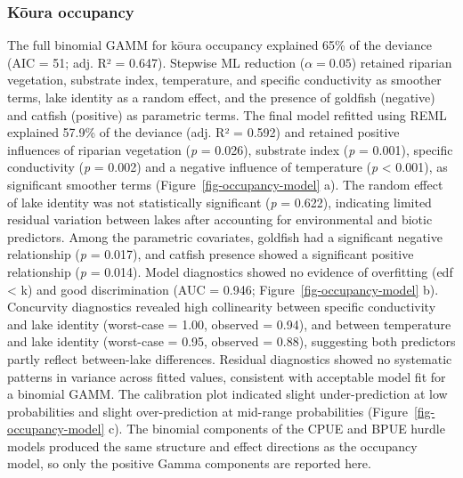 \documentclass[
  letterpaper,
  DIV=11,
  numbers=noendperiod]{scrartcl}
\begin{document}
\subsubsection{Kōura occupancy}\label{kux14dura-occupancy}

The full binomial GAMM for kōura occupancy explained 65\% of the
deviance (AIC = 51; adj. R² = 0.647). Stepwise ML reduction
(\(\alpha = 0.05\)) retained riparian vegetation, substrate index,
temperature, and specific conductivity as smoother terms, lake identity
as a random effect, and the presence of goldfish (negative) and catfish
(positive) as parametric terms. The final model refitted using REML
explained 57.9\% of the deviance (adj. R² = 0.592) and retained positive
influences of riparian vegetation (\emph{p} = 0.026), substrate index
(\emph{p} = 0.001), specific conductivity (\emph{p} = 0.002) and a
negative influence of temperature (\emph{p} \textless{} 0.001), as
significant smoother terms (Figure~\ref{fig-occupancy-model} a). The
random effect of lake identity was not statistically significant
(\emph{p} = 0.622), indicating limited residual variation between lakes
after accounting for environmental and biotic predictors. Among the
parametric covariates, goldfish had a significant negative relationship
(\emph{p} = 0.017), and catfish presence showed a significant positive
relationship (\emph{p} = 0.014). Model diagnostics showed no evidence of
overfitting (edf \textless{} k) and good discrimination (AUC = 0.946;
Figure~\ref{fig-occupancy-model} b). Concurvity diagnostics revealed
high collinearity between specific conductivity and lake identity
(worst-case = 1.00, observed = 0.94), and between temperature and lake
identity (worst-case = 0.95, observed = 0.88), suggesting both
predictors partly reflect between-lake differences. Residual diagnostics
showed no systematic patterns in variance across fitted values,
consistent with acceptable model fit for a binomial GAMM. The
calibration plot indicated slight under-prediction at low probabilities
and slight over-prediction at mid-range probabilities
(Figure~\ref{fig-occupancy-model} c). The binomial components of the
CPUE and BPUE hurdle models produced the same structure and effect
directions as the occupancy model, so only the positive Gamma components
are reported here.
\end{document}
